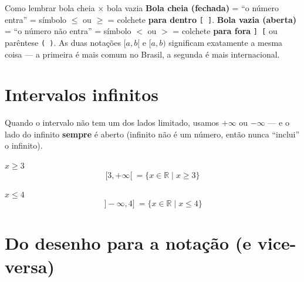\documentclass[12pt,a4paper]{article}
\newcommand{\bolaFechada}[1]{\filldraw[blue] (#1,0) circle (2.2pt);}
\begin{document}
\begin{dica}{Como lembrar bola cheia $\times$ bola vazia}
\textbf{Bola cheia (fechada)} = ``o número entra'' = símbolo $\le$ ou $\ge$
= colchete \textbf{para dentro} \texttt{[ ]}. \textbf{Bola vazia (aberta)} =
``o número não entra'' = símbolo $<$ ou $>$ = colchete \textbf{para fora}
\texttt{] [} ou parêntese \texttt{( )}. As duas notações $[a,b[$ e $[a,b)$
significam exatamente a mesma coisa — a primeira é mais comum no Brasil, a
segunda é mais internacional.
\end{dica}

\section{Intervalos infinitos}

Quando o intervalo não tem um dos lados limitado, usamos $+\infty$ ou
$-\infty$ — e o lado do infinito \textbf{sempre} é aberto (infinito não é um
número, então nunca ``inclui'' o infinito).

\begin{exemplo}{$x \ge 3$}
\[
[3,+\infty[ \ = \{x\in\mathbb{R}\mid x\ge 3\}
\]
\begin{center}
\end{center}
\end{exemplo}

\begin{exemplo}{$x \le 4$}
\[
\,]-\infty,4]\ = \{x\in\mathbb{R}\mid x\le 4\}
\]
\begin{center}
\end{center}
\end{exemplo}

\section{Do desenho para a notação (e vice-versa)}
\end{document}
